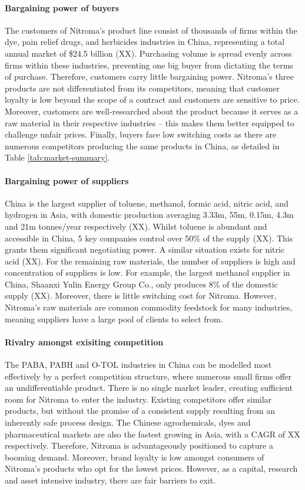 \paragraph{Bargaining power of buyers}
The customers of Nitroma’s product line consist of thousands of firms within the dye, pain relief drugs, and herbicides industries in China, representing a total annual market of \$24.5 billion (XX). Purchasing volume is spread evenly across firms within these industries, preventing one big buyer from dictating the terms of purchase. Therefore, customers carry little bargaining power. Nitroma’s three products are not differentiated from its competitors, meaning that customer loyalty is low beyond the scope of a contract and customers are sensitive to price. Moreover, customers are well-researched about the product because it serves as a raw material in their respective industries – this makes them better equipped to challenge unfair prices. Finally, buyers face low switching costs as there are numerous competitors producing the same products in China, as detailed in Table \ref{tab:market-summary}.

\paragraph{Bargaining power of suppliers}
China is the largest supplier of toluene, methanol, formic acid, nitric acid, and hydrogen in Asia, with domestic production averaging 3.33m, 55m, 0.15m, 4.3m and 21m tonnes/year respectively (XX). Whilst toluene is abundant and accessible in China, 5 key companies control over 50\% of the supply (XX). This grants them significant negotiating power. A similar situation exists for nitric acid (XX). For the remaining raw materials, the number of suppliers is high and concentration of suppliers is low. For example, the largest methanol supplier in China, Shaanxi Yulin Energy Group Co., only produces 8\% of the domestic supply (XX). Moreover, there is little switching cost for Nitroma. However, Nitroma’s raw materials are common commodity feedstock for many industries, meaning suppliers have a large pool of clients to select from.

\paragraph{Rivalry amongst exisiting competition}
The PABA, PABH and O-TOL industries in China can be modelled most effectively by a perfect competition structure, where numerous small firms offer an undifferentiable product. There is no single market leader, creating sufficient room for Nitroma to enter the industry. Existing competitors offer similar products, but without the promise of a consistent supply resulting from an inherently safe process design. The Chinese agrochemicals, dyes and pharmaceutical markets are also the fastest growing in Asia, with a CAGR of XX respectively. Therefore, Nitroma is advantageously positioned to capture a booming demand. Moreover, brand loyalty is low amongst consumers of Nitroma’s products who opt for the lowest prices. However, as a capital, research and asset intensive industry, there are fair barriers to exit. 

